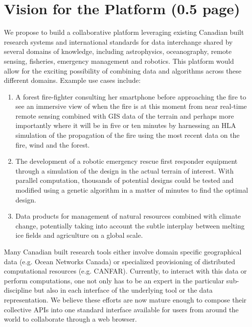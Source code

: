 \documentclass[pdftex,12pt]{article}
\begin{document}
\pagestyle{myheadings}

\section{Vision for the Platform (0.5 page)}

We propose to build a collaborative platform leveraging existing
Canadian built research systems and international standards for data
interchange shared by several domains of knowledge, including
astrophysics, oceanography, remote sensing, fisheries, emergency
management and robotics.  This platform would allow for the exciting
possibility of combining data and algorithms across these different
domains.  Example use cases include:
\begin{enumerate}
\item A forest fire-fighter consulting her smartphone before
  approaching the fire to see an immersive view of when the fire is at
  this moment from near real-time remote sensing combined with GIS
  data of the terrain and perhaps more importantly where it will be in
  five or ten minutes by harnessing an HLA simulation of the
  propagation of the fire using the most recent data on the fire, wind
  and the forest.
\item The development of a robotic emergency rescue first responder
  equipment through a simulation of the design in the actual terrain
  of interest.  With parallel computation, thousands of potential
  designs could be tested and modified using a genetic algorithm in a
  matter of minutes to find the optimal design.
\item Data products for management of natural resources combined with
  climate change, potentially taking into account the subtle interplay
  between melting ice fields and agriculture on a global scale.
\end{enumerate}

Many Canadian built research tools either involve domain specific
geographical data (e.g. Ocean Networks Canada) or specialized
provisioning of distributed computational resources
(e.g. CANFAR). Currently, to interact with this data or perform
computations, one not only has to be an expert in the particular
sub-discipline but also in each interface of the underlying tool or
the data representation.  We believe these efforts are now mature
enough to compose their collective APIs into one standard interface
available for users from around the world to collaborate through a web
browser.
\end{document}
